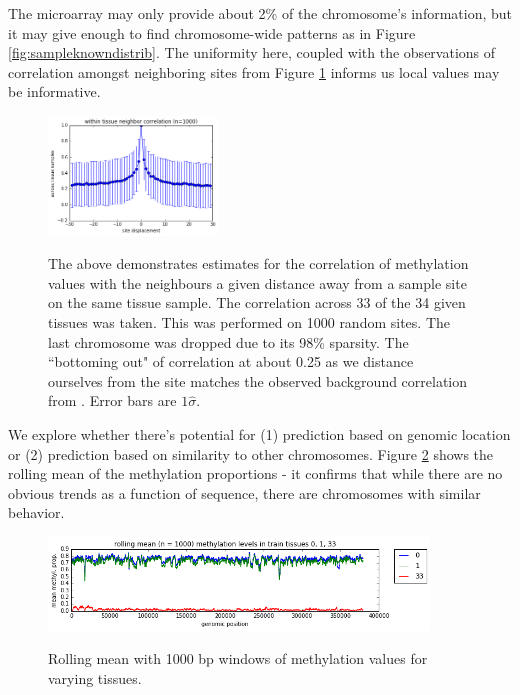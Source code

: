 \documentclass{article} %
\begin{document}
The microarray may only provide about 2\% of the chromosome's information, but it may give enough to find chromosome-wide patterns as in Figure \ref{fig:sampleknowndistrib}. The uniformity here, coupled with the observations of correlation amongst neighboring sites from Figure \ref{fig:colocalsite} informs us local values may be informative.

\begin{figure}[H]
    \centering
    \includegraphics[width=0.4\textwidth]{colocalisitecorr.png}
    \label{fig:colocalsite}
    \caption{The above demonstrates estimates for the correlation of methylation values with the neighbours a given distance away from a sample site on the same tissue sample. The correlation across 33 of the 34 given tissues was taken. This was performed on 1000 random sites. The last chromosome was dropped due to its 98\% sparsity. The ``bottoming out" of correlation at about 0.25 as we distance ourselves from the site matches the observed background correlation from \cite{zhang2015predicting}. Error bars are $1\hat{\sigma}$.}
\end{figure}

We explore whether there's potential for (1) prediction based on genomic location or (2) prediction based on similarity to other chromosomes. Figure \ref{fig:genomictrends} shows the rolling mean of the methylation proportions - it confirms that while there are no obvious trends as a function of sequence, there are chromosomes with similar behavior.

\begin{figure}[H]
    \centering
    \includegraphics[width=0.9\textwidth]{genomictrends.png}
    \label{fig:genomictrends}
    \caption{Rolling mean with 1000 bp windows of methylation values for varying tissues.}
\end{figure}
\end{document}

